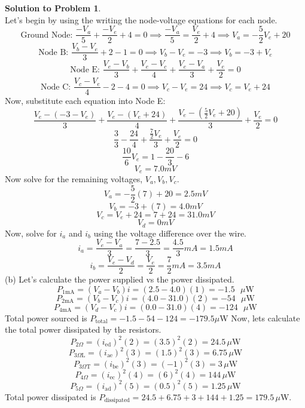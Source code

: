 \documentclass[11pt,letterpaper]{article}
\theoremstyle{definition}
\newtheorem{solprob}{\textcolor{solproblemcolor}{Solution to Problem}}  %
\begin{document}
\begin{solprob} \text{}\\
    Let's begin by using the writing the node-voltage equations for each node.
    \[\text{Ground Node: } \frac{-V_a}{5}+\frac{-V_e}{2} + 4 = 0 \implies \frac{-V_a}{5} = \frac{V_e}{2} + 4 \implies V_a = -\frac{5}{2}V_e + 20\]
    \[\text{Node B: } \frac{V_b-V_e}{3} + 2 - 1 = 0 \implies V_b-V_e = -3 \implies V_b = -3 + V_e\]
    \[\text{Node E: } \frac{V_e-V_b}{3} + \frac{V_e-V_c}{4} + \frac{V_e-V_a}{3} + \frac{V_e}{2} = 0\]
    \[\text{Node C: } \frac{V_c - V_e}{4} -2 -4 = 0 \implies V_c-V_e = 24 \implies V_c = V_e + 24\]
    Now, substitute each equation into Node E:
    \[\frac{V_e-(-3-V_e)}{3} + \frac{V_e-(V_e+24)}{4} + \frac{V_e-(\frac{5}{2}V_e + 20)}{3} + \frac{V_e}{2} = 0\]
    \[\frac{3}{3} - \frac{24}{4} + \frac{\frac{7}{2}V_e}{3} + \frac{V_e}{2} = 0\]
    \[\frac{10}{6}V_e = 1-\frac{20}{3}-6\]
    \[V_e = 7.0mV\]
    Now solve for the remaining voltages, $V_a, V_b, V_c$.
    \[V_a = -\frac{5}{2}(7) + 20 = 2.5mV\]
    \[V_b = -3 + (7) = 4.0mV\]
    \[V_c = V_e + 24 = 7+24 = 31.0mV\]
    \[V_d = 0mV\]
    Now, solve for $i_a$ and $i_b$ using the voltage difference over the wire.
    \[i_a = \frac{V_e-V_a}{3} = \frac{7-2.5}{3} = \frac{4.5}{3}mA = 1.5mA\]
    \[i_b = \frac{V_e-V_d}{2} = \frac{V_e}{2} = \frac{7}{2}mA = 3.5mA\]
    (b) Let's calculate the power supplied vs the power dissipated.
    \[P_\text{1mA} = (V_a-V_b)i = (2.5-4.0)(1) = -1.5 \text{ $\mu$W}\]
    \[P_\text{2mA} = (V_b-V_c)i = (4.0-31.0)(2) = -54 \text{ $\mu$W}\]
    \[P_\text{4mA} = (V_d-V_c)i = (0.0-31.0)(4) = -124 \text{ $\mu$W}\]
    Total power sourced is $P_\text{total} = -1.5 - 54 - 124 = -179.5 \mu$W\newline
    Now, lets calculate the total power dissipated by the resistors.
    \[P_\text{2$\Omega$} = (i_\text{ed})^2(2) = (3.5)^2(2) = 24.5 \,\mu\text{W}\]
    \[P_\text{3$\Omega$L} = (i_\text{ae})^2(3) = (1.5)^2(3) = 6.75 \,\mu\text{W}\]
    \[P_\text{3$\Omega$T} = (i_\text{be})^2(3) = (-1)^2(3) = 3 \,\mu\text{W}\]
    \[P_\text{4$\Omega$} = (i_\text{ec})^2(4) = (6)^2(4) = 144 \,\mu\text{W}\]
    \[P_\text{5$\Omega$} = (i_\text{ad})^2(5) = (0.5)^2(5) = 1.25 \,\mu\text{W}\]
    Total power dissipated is $P_\text{dissipated} = 24.5 + 6.75 + 3 + 144 + 1.25 = 179.5\,\mu$W.\newline
\end{solprob}

\vspace{-5mm}
\end{document}
